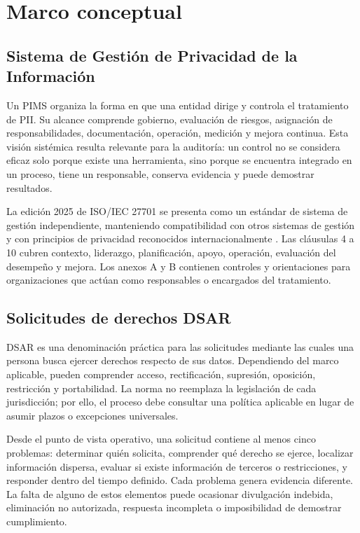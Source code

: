 \documentclass[11pt,a4paper]{article}
\begin{document}
\section{Marco conceptual}

\subsection{Sistema de Gestión de Privacidad de la Información}

Un PIMS organiza la forma en que una entidad dirige y controla el tratamiento de PII. Su alcance comprende gobierno, evaluación de riesgos, asignación de responsabilidades, documentación, operación, medición y mejora continua. Esta visión sistémica resulta relevante para la auditoría: un control no se considera eficaz solo porque existe una herramienta, sino porque se encuentra integrado en un proceso, tiene un responsable, conserva evidencia y puede demostrar resultados.

La edición 2025 de ISO/IEC 27701 se presenta como un estándar de sistema de gestión independiente, manteniendo compatibilidad con otros sistemas de gestión y con principios de privacidad reconocidos internacionalmente \cite{iso27701,iso29100}. Las cláusulas 4 a 10 cubren contexto, liderazgo, planificación, apoyo, operación, evaluación del desempeño y mejora. Los anexos A y B contienen controles y orientaciones para organizaciones que actúan como responsables o encargados del tratamiento.

\subsection{Solicitudes de derechos DSAR}

DSAR es una denominación práctica para las solicitudes mediante las cuales una persona busca ejercer derechos respecto de sus datos. Dependiendo del marco aplicable, pueden comprender acceso, rectificación, supresión, oposición, restricción y portabilidad. La norma no reemplaza la legislación de cada jurisdicción; por ello, el proceso debe consultar una política aplicable en lugar de asumir plazos o excepciones universales.

Desde el punto de vista operativo, una solicitud contiene al menos cinco problemas: determinar quién solicita, comprender qué derecho se ejerce, localizar información dispersa, evaluar si existe información de terceros o restricciones, y responder dentro del tiempo definido. Cada problema genera evidencia diferente. La falta de alguno de estos elementos puede ocasionar divulgación indebida, eliminación no autorizada, respuesta incompleta o imposibilidad de demostrar cumplimiento.
\end{document}
